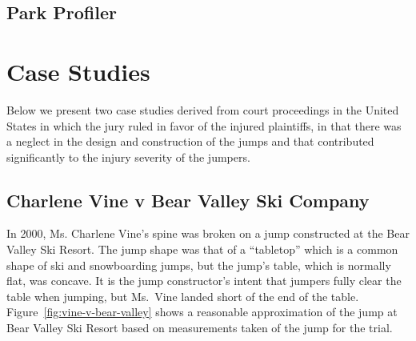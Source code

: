\documentclass{article}
\begin{document}
\subsection{Park Profiler}
%

\section{Case Studies}
%
Below we present two case studies derived from court proceedings in the United
States in which the jury ruled in favor of the injured plaintiffs, in that
there was a neglect in the design and construction of the jumps and that
contributed significantly to the injury severity of the jumpers.


\subsection{Charlene Vine v Bear Valley Ski Company}
%
In 2000, Ms. Charlene Vine's spine was broken on a jump constructed at the Bear Valley
Ski Resort. The jump shape was that of a ``tabletop'' which is a common shape
of ski and snowboarding jumps, but the jump's table, which is normally flat,
was concave. It is the jump constructor's intent that jumpers fully clear the
table when jumping, but Ms.~Vine landed short of the end of the table.
Figure~\ref{fig:vine-v-bear-valley} shows a reasonable approximation of the
jump at Bear Valley Ski Resort based on measurements taken of the jump for the
trial.
\end{document}
